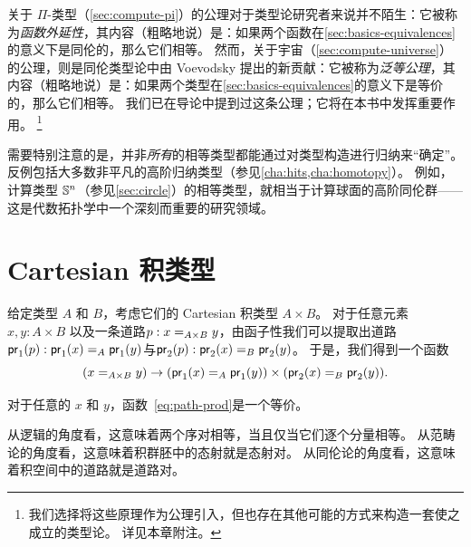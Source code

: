 %
%
关于 $\Pi$-类型（\cref{sec:compute-pi}）的公理对于类型论研究者来说并不陌生：它被称为\emph{函数外延性}，其内容（粗略地说）是：如果两个函数在\cref{sec:basics-equivalences}的意义下是同伦的，那么它们相等。
然而，关于宇宙（\cref{sec:compute-universe}）的公理，则是同伦类型论中由 Voevodsky 提出的新贡献：它被称为\emph{泛等公理}，其内容（粗略地说）是：如果两个类型在\cref{sec:basics-equivalences}的意义下是等价的，那么它们相等。
我们已在导论中提到过这条公理；它将在本书中发挥重要作用。%
\footnote{我们选择将这些原理作为公理引入，但也存在其他可能的方式来构造一套使之成立的类型论。
  详见本章附注。}

需要特别注意的是，并非\emph{所有}的相等类型都能通过对类型构造进行归纳来``确定''。
反例包括大多数非平凡的高阶归纳类型（参见\cref{cha:hits,cha:homotopy}）。
例如，计算类型 $\Sn^n$（参见\cref{sec:circle}）的相等类型，就相当于计算球面的高阶同伦群——这是代数拓扑学中一个深刻而重要的研究领域。

\section{Cartesian 积类型}
\label{sec:compute-cartprod}

%
给定类型 $A$ 和 $B$，考虑它们的 Cartesian 积类型 $A \times B$。
对于任意元素 $x,y:A\times B$ 以及一条道路$p:\id[A\times B]{x}{y}$，由函子性我们可以提取出道路$\ap{\proj1}p:\id[A]{\proj1(x)}{\proj1(y)}$与$\ap{\proj2}p:\id[B]{\proj2(x)}{\proj2(y)}$。
于是，我们得到一个函数
\begin{equation}\label{eq:path-prod}
  (\id[A\times B]{x}{y}) \to (\id[A]{\proj1(x)}{\proj1(y)}) \times (\id[B]{\proj2(x)}{\proj2(y)}).
\end{equation}

\begin{thm}\label{thm:path-prod}
  对于任意的 $x$ 和 $y$，函数~\eqref{eq:path-prod}是一个等价。
\end{thm}

从逻辑的角度看，这意味着两个序对相等，当且仅当它们逐个分量相等。
从范畴论的角度看，这意味着积群胚中的态射就是态射对。
从同伦论的角度看，这意味着积空间中的道路就是道路对。

